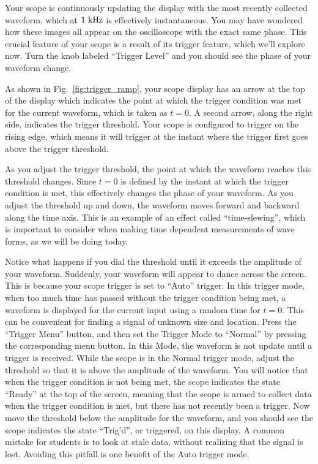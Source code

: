 Your scope is continuously updating the display with the most recently
collected waveform, which at $1~\rm kHz$ is effectively instantaneous.
You may have wondered how these images all appear on the oscilloscope
with the exact same phase.  This crucial feature of your scope is a
result of its trigger feature, which we'll explore now.  Turn the knob
labeled ``Trigger Level'' and you should see the phase of your
waveform change.

As shown in Fig.~\ref{fig:trigger_ramp}, your scope display has an arrow at
the top of the display which indicates the point at which the trigger
condition was met for the current waveform, which is taken as $t=0$.
A second arrow, along the right side, indicates the trigger threshold.
Your scope is configured to trigger on the rising edge, which means it
will trigger at the instant where the trigger first goes above the
trigger threshold.

As you adjust the trigger threshold, the point at which the waveform
reaches this threshold changes.  Since $t=0$ is defined by the instant
at which the trigger condition is met, this effectively changes the
phase of your waveform.  As you adjust the threshold up and down, the
waveform moves forward and backward along the time axis.  This is an
example of an effect called ``time-slewing'', which is important to
consider when making time dependent measurements of wave forms, as we
will be doing today.

Notice what happens if you dial the threshold until it exceeds the
amplitude of your waveform.  Suddenly, your waveform will appear to
dance across the screen.  This is because your scope trigger is set to
``Auto'' trigger.  In this trigger mode, when too much time has passed
without the trigger condition being met, a waveform is displayed for
the current input using a random time for $t=0$.  This can be
convenient for finding a signal of unknown size and location.  Press
the ``Trigger Menu'' button, and then set the Trigger Mode to
``Normal'' by pressing the corresponding menu button.  In this Mode,
the waveform is not update until a trigger is received.  While the
scope is in the Normal trigger mode, adjust the threshold so that it
is above the amplitude of the waveform.  You will notice that when the
trigger condition is not being met, the scope indicates the state
``Ready'' at the top of the screen, meaning that the scope is armed to
collect data when the trigger condition is met, but there has not
recently been a trigger.  Now move the threshold below the amplitude
for the waveform, and you should see the scope indicates the state
``Trig'd'', or triggered, on this display.  A common mistake for
students is to look at stale data, without realizing that the signal
is lost.  Avoiding this pitfall is one benefit of the Auto trigger
mode.


